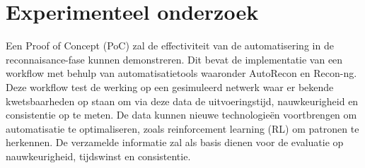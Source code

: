 \section{Experimenteel onderzoek}

Een Proof of Concept (PoC) zal de effectiviteit van de automatisering in de reconnaisance-fase kunnen demonstreren.
Dit bevat de implementatie van een workflow met behulp van automatisatietools waaronder AutoRecon en Recon-ng. 
Deze workflow test de werking op een gesimuleerd netwerk waar er bekende kwetsbaarheden op staan om via deze data de uitvoeringstijd,
nauwkeurigheid en consistentie op te meten. De data kunnen nieuwe technologieën voortbrengen om automatisatie te optimaliseren,
zoals reinforcement learning (RL) om patronen te herkennen.
De verzamelde informatie zal als basis dienen voor de evaluatie op nauwkeurigheid, tijdswinst en consistentie.







